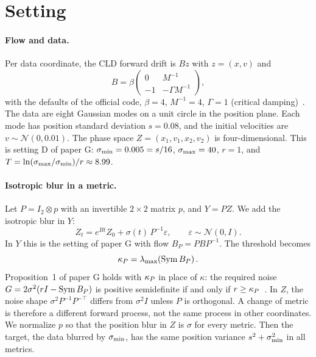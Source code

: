 \section{Setting}
\label{sec:setting}

\paragraph*{Flow and data.}
Per data coordinate, the CLD forward drift is $Bz$ with $z=(x,v)$ and
\begin{equation}
B=\beta\begin{pmatrix}0 & M^{-1}\\ -1 & -\Gamma M^{-1}\end{pmatrix},
\label{eq:B}
\end{equation}
with the defaults of the official code, $\beta=4$, $M^{-1}=4$, $\Gamma=1$ (critical damping)~\cite{dockhorn2022cld}.
The data are eight Gaussian modes on a unit circle in the position plane.
Each mode has position standard deviation $s=0.08$, and the initial velocities are $v\sim\mathcal N(0,0.01)$.
The phase space $Z=(x_1,v_1,x_2,v_2)$ is four-dimensional.
This is setting D of paper G: $\sigma_{\min}=0.005=s/16$, $\sigma_{\max}=40$, $r=1$, and $T=\ln(\sigma_{\max}/\sigma_{\min})/r\approx8.99$.

\paragraph*{Isotropic blur in a metric.}
Let $P=I_2\otimes p$ with an invertible $2\times2$ matrix $p$, and $Y=PZ$.
We add the isotropic blur in $Y$:
\begin{equation}
Z_t=e^{Bt}Z_0+\sigma(t)\,P^{-1}\varepsilon,\qquad \varepsilon\sim\mathcal N(0,I).
\label{eq:forward}
\end{equation}
In $Y$ this is the setting of paper G with flow $B_P=PBP^{-1}$.
The threshold becomes
\begin{equation}
\kappa_P=\lambda_{\max}\!\left(\operatorname{Sym} B_P\right).
\end{equation}
Proposition~1 of paper G holds with $\kappa_P$ in place of $\kappa$: the required noise $G=2\sigma^2(rI-\operatorname{Sym} B_P)$ is positive semidefinite if and only if $r\geq\kappa_P$~\cite{namba2026threshold}.
In $Z$, the noise shape $\sigma^2P^{-1}P^{-\top}$ differs from $\sigma^2 I$ unless $P$ is orthogonal.
A change of metric is therefore a different forward process, not the same process in other coordinates.
We normalize $p$ so that the position blur in $Z$ is $\sigma$ for every metric.
Then the target, the data blurred by $\sigma_{\min}$, has the same position variance $s^2+\sigma_{\min}^2$ in all metrics.

